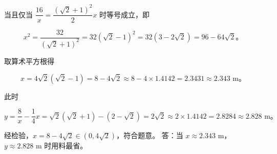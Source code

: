 \begin{answer}
当且仅当 $\dfrac{16}{x} = \dfrac{(\sqrt{2} + 1)^2}{2}x$ 时等号成立，即

\nopagebreak[4]
\[
x^2 = \dfrac{32}{(\sqrt{2} + 1)^2} = 32(\sqrt{2} - 1)^2 = 32(3 - 2\sqrt{2}) = 96 - 64\sqrt{2}\mbox{。}
\]

取算术平方根得

\nopagebreak[4]
\[
x = 4\sqrt{2}(\sqrt{2} - 1) = 8 - 4\sqrt{2} \approx 8 - 4 \times 1.4142 = 2.3431 \approx 2.343\text{ m}\mbox{。}
\]

此时

\nopagebreak[4]
\[
y = \dfrac{8}{x} - \dfrac{1}{4}x = \sqrt{2}(\sqrt{2} + 1) - (2 - \sqrt{2}) = 2\sqrt{2} \approx 2 \times 1.4142 = 2.8284 \approx 2.828\text{ m}\mbox{。}
\]

经检验，$x = 8 - 4\sqrt{2} \in (0, 4\sqrt{2})$，符合题意。
答：当 $x \approx 2.343\text{ m}$，$y \approx 2.828\text{ m}$ 时用料最省。


\end{answer}
